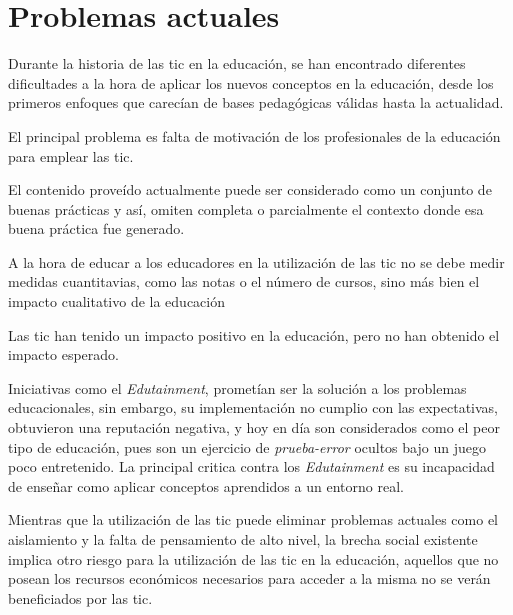 \section{Problemas actuales}
\label{tics:problemas}

Durante la historia de las \Gls{tic} en la educación, se han encontrado
diferentes dificultades a la hora de aplicar los nuevos conceptos en la
educación, desde los primeros enfoques que carecían de bases pedagógicas válidas
hasta la actualidad.

El principal problema es falta de motivación de los profesionales de la
educación para emplear las \Gls{tic}\cite{punie:ict}\cite{ict:romeo}.

El contenido proveído actualmente puede ser considerado como un conjunto de
buenas prácticas\cite{punie:ict} y así, omiten completa o parcialmente el
contexto donde esa buena práctica fue generado.

A la hora de educar a los educadores en la utilización de las \Gls{tic} no se
debe medir medidas cuantitavias, como las notas o el número de cursos, sino más
bien el impacto cualitativo de la educación

Las \Gls{tic} han tenido un impacto positivo en la educación\cite{punie:ict},
pero no han obtenido el impacto esperado.

Iniciativas como el \emph{Edutainment}, prometían ser la solución a los
problemas educacionales, sin embargo, su implementación no cumplio con las
expectativas, obtuvieron una reputación negativa, y hoy en día son considerados
como el peor tipo de educación, pues son un ejercicio de \emph{prueba-error}
ocultos bajo un juego poco entretenido\cite{resnick:2004}. La principal critica
contra los \emph{Edutainment} es su incapacidad de enseñar como aplicar
conceptos aprendidos a un entorno real\cite{resnick:2004}.

Mientras que la utilización de las \Gls{tic} puede eliminar problemas actuales
como el aislamiento y la falta de pensamiento de alto nivel\cite{punie:ict}, la
brecha social existente implica otro riesgo para la utilización de las \Gls{tic}
en la educación, aquellos que no posean los recursos económicos necesarios para
acceder a la misma no se verán beneficiados por las \Gls{tic}\cite{punie:ict}.


